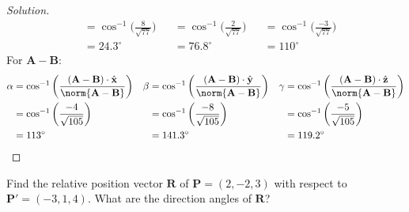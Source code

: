 \documentclass[crop=false,class=book,oneside]{standalone}
\begin{document}
\begin{proof}[Solution]
\begin{align*}
                    &=\cos^{-1}\bigg(\frac{8}{\sqrt{77}}\bigg)
                    &
                    &=\cos^{-1}\bigg(\frac{2}{\sqrt{77}}\bigg)&
                    &=\cos^{-1}\bigg(\frac{-3}{\sqrt{77}}\bigg)\\
                    &=24.3^{\circ}
                    &
                    &=76.8^{\circ}
                    &
                    &=110^{\circ}
                \end{align*}
                For $\mathbf{A}-\mathbf{B}$:
                \begin{align*}
                    \alpha
                    &=\cos^{-1}\bigg(
                        \frac{(\mathbf{A}-\mathbf{B})
                        \cdot\hat{\mathbf{x}}}
                        {\norm{\mathbf{A-B}}}
                    \bigg)
                    &
                    \beta
                    &=\cos^{-1}\bigg(
                    \frac{(\mathbf{A}-\mathbf{B})
                    \cdot\hat{\mathbf{y}}}
                        {\norm{\mathbf{A}-\mathbf{B}}}
                    \bigg)
                    &
                    \gamma
                    &=\cos^{-1}\bigg(
                        \frac{(\mathbf{A}-\mathbf{B})
                        \cdot\hat{\mathbf{z}}}
                        {\norm{\mathbf{A}-\mathbf{B}}}
                    \bigg)\\
                    &=
                    \cos^{-1}\bigg(\frac{-4}{\sqrt{105}}\bigg)
                    &
                    &=\cos^{-1}\bigg(\frac{-8}{\sqrt{105}}\bigg)
                    &
                    &=\cos^{-1}\bigg(\frac{-5}{\sqrt{105}}\bigg)\\
                    &=113^{\circ}
                    &
                    &=141.3^{\circ}
                    &
                    &=119.2^{\circ}
                \end{align*}
            \end{proof}
            \begin{problem}[Wangsness 1-3]
                Find the relative position vector $\mathbf{R}$
                of $\mathbf{P}=(2,-2,3)$
                with respect to $\mathbf{P}'=(-3,1,4)$.
                What are the direction angles of $\mathbf{R}$?
            \end{problem}
\end{document}
